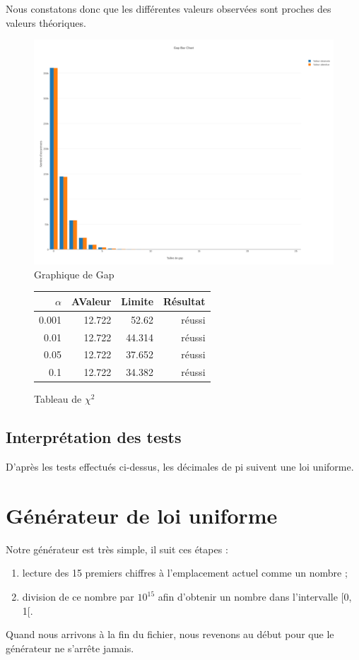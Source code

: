 \documentclass[10pt,a4paper]{article}
\begin{document}
Nous constatons donc que les différentes valeurs observées sont proches des valeurs théoriques.

\newpage

\begin{figure}[h]
\centering
\includegraphics[scale=0.3]{../chart_images/gap_bar_chart.png}
\caption{Graphique de Gap}
\end{figure}

\begin{figure}[h]
\centering
\begin{tabular}{|r|r|r|r|}
\hline
$\alpha$ & AValeur & Limite & Résultat\\
\hline
0.001 & 12.722 & 52.62 & réussi\\
0.01 & 12.722 & 44.314 & réussi\\
0.05 & 12.722 & 37.652 & réussi\\
0.1 & 12.722 & 34.382 & réussi\\
\hline
\end{tabular}
\caption{Tableau de $\chi^2$}
\end{figure}



\newpage
\subsection{Interprétation des tests}
D'après les tests effectués ci-dessus, les décimales de pi suivent une loi uniforme.
	
	\newpage
	\section{Générateur de loi uniforme}
	Notre générateur est très simple, il suit ces étapes :
	\begin{enumerate}
		\item lecture des 15 premiers chiffres à l'emplacement actuel comme un nombre ;
		\item division de ce nombre par $10^{15}$ afin d'obtenir un nombre dans l'intervalle [0, 1[.
	\end{enumerate}
	Quand nous arrivons à la fin du fichier, nous revenons au début pour que le générateur ne s'arrête jamais.
	
\end{document}
